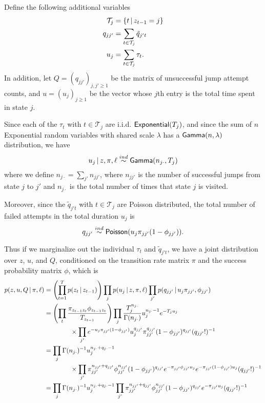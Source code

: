 Define the following additional variables
\begin{align}
  \label{eq:56}
    \mathcal{T}_j &= \{t \, \vert \, z_{t-1} = j\} \\
    q_{jj'} &= \sum_{t \in \mathcal{T}_j}\tilde{q}_{j't} \\
    u_j &= \sum_{t \in \mathcal{T}_j} \tau_t.
\end{align}
In addition, let $Q = (q_{jj'})_{j,j' \geq 1}$ be the matrix of unsuccessful
jump attempt counts, and $u = (u_j)_{j \geq 1}$ be the vector whose
$j$th entry is the total time spent in state $j$.

Since each of the $\tau_t$ with $t \in \mathcal{T}_j$ are
i.i.d. $\mathsf{Exponential}(T_j)$, and since the sum of $n$ Exponential random
variables with shared scale $\lambda$ has a $\mathsf{Gamma}(n,\lambda)$
distribution, we have
\begin{equation}
u_j \, \vert \, z, \pi, \ell \stackrel{ind}{\sim} \mathsf{Gamma}(n_{j\cdot},T_j)
\end{equation}
where we define $n_{j\cdot} = \sum_{j'} n_{jj'}$, where $n_{jj'}$ is
the number of successful jumps from state $j$ to $j'$ and $n_{j\cdot}$
is the total number of times that state $j$ is visited.

Moreover, since the $\tilde{q}_{j't}$ with $t \in \mathcal{T}_j$ 
are Poisson distributed, the total number of failed
attempts in the total duration $u_j$ is
\begin{equation}
  \label{eq:60}
  q_{jj'} \stackrel{ind}{\sim} \mathsf{Poisson}(u_j\pi_{jj'}(1-\phi_{jj'})).
\end{equation}

Thus if we marginalize out the individual $\tau_t$ and
$\tilde{q}_{j't}$, we have a joint distribution
over $z$, $u$, and $Q$, conditioned on the transition rate
matrix $\pi$ and the success probability matrix $\phi$, which is
\begin{align}
  \label{eq:54}
  p(z, u, Q \, \vert \, \pi, \ell) &= \left(\prod_{t=1}^T p(z_{t} \, \vert \,
    z_{t-1})\right) \prod_{j} p(u_j \, \vert \, z, \pi, \ell)
  \prod_{j'} p(q_{jj'} \, \vert \, u_j \pi_{jj'}, \phi_{jj'}) \\
  &= \left(\prod_{t} \frac{\pi_{z_{t-1}z_t}\phi_{z_{t-1}z_t}}{T_{z_{t-1}}}\right) \prod_{j}
  \frac{T_j^{n_{j\cdot}}}{\Gamma(n_{j\cdot})} u_j^{n_{j\cdot} - 1}
  e^{-T_j u_j} \\ &\qquad\qquad\times
  \prod_{j'} e^{-u_j\pi_{jj'}(1-\phi_{jj'})} u_j^{q_{jj'}}
  \pi_{jj'}^{q_{jj'}} (1-\phi_{jj'})^{q_{jj'}} (q_{jj'}!)^{-1} \\
  &= \prod_{j} \Gamma(n_{j\cdot})^{-1} u_j^{n_{j\cdot} + q_{j\cdot}-1}
  \\ &\qquad\qquad \times \prod_{j'}
  \pi_{jj'}^{n_{jj'} + q_{jj'}} \phi_{jj'}^{n_{jj'}}
  (1-\phi_{jj'})^{q_{jj'}} e^{-\pi_{jj'}\phi_{jj'}u_j}
  e^{-\pi_{jj'}(1-\phi_{jj'})u_j} (q_{jj'}!)^{-1} \\
  &\label{eq:joint-likelihood} = \prod_{j} \Gamma(n_{j\cdot})^{-1} u_j^{n_{j\cdot} + q_{j\cdot}-1} \prod_{j'}
  \pi_{jj'}^{n_{jj'} + q_{jj'}} \phi_{jj'}^{n_{jj'}}
  (1-\phi_{jj'})^{q_{jj'}} e^{-\pi_{jj'}u_j} (q_{jj'}!)^{-1}
\end{align}


